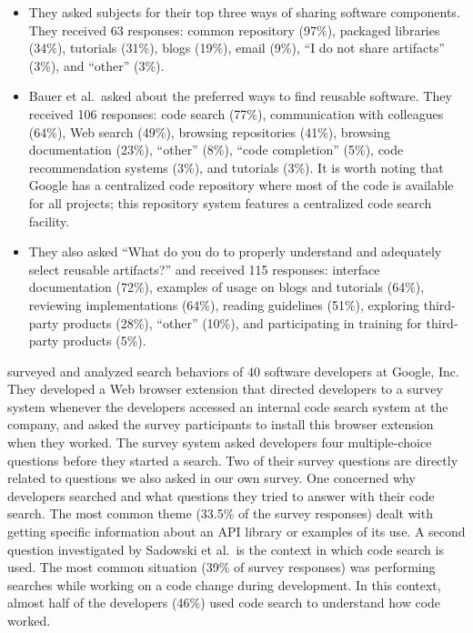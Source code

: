 \documentclass[review]{elsarticle}
\begin{document}
\begin{itemize}

\item They asked subjects for their top three ways of sharing software components.  They received 63 responses: common repository (97\%), packaged libraries (34\%), tutorials (31\%), blogs (19\%), email (9\%), ``I do not share artifacts'' (3\%), and ``other'' (3\%).

\item Bauer et al.\ asked about the preferred ways to find reusable software.  They received 106 responses: code search (77\%), communication with colleagues (64\%), Web search (49\%), browsing repositories (41\%), browsing documentation (23\%), ``other'' (8\%), ``code completion'' (5\%), code recommendation systems (3\%), and tutorials (3\%).  It is worth noting that Google has a centralized code repository where most of the code is available for all projects; this repository system features a centralized code search facility.

\item They also asked ``What do you do to properly understand and adequately select reusable artifacts?'' and received 115 responses: interface documentation (72\%), examples of usage on blogs and tutorials (64\%), reviewing implementations (64\%), reading guidelines (51\%), exploring third-party products (28\%), ``other'' (10\%), and participating in training for third-party products (5\%).

\end{itemize}

\citet{sadowski2015developers} surveyed and analyzed search behaviors of 40 software developers at Google, Inc.  They developed a Web browser extension that directed developers to a survey system whenever the developers accessed an internal code search system at the company, and asked the survey participants to install this browser extension when they worked.  The survey system asked developers four multiple-choice questions before they started a search.  Two of their survey questions are directly related to questions we also asked in our own survey.  One concerned why developers searched and what questions they tried to answer with their code search.  The most common theme (33.5\% of the survey responses) dealt with getting specific information about an API library or examples of its use.  A second question investigated by Sadowski et al.\ is the context in which code search is used.  The most common situation (39\% of survey responses) was performing searches while working on a code change during development.  In this context, almost half of the developers (46\%) used code search to understand how code worked.
\end{document}
